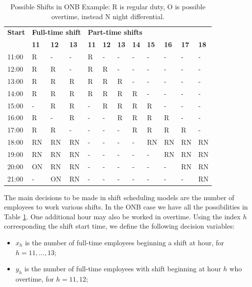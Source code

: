 \documentclass[a4paper,10 pt,titlepage,twoside]{book}
\theoremstyle{plain}
\theoremstyle{definition}
\theoremstyle{remark}
\begin{document}
{{\begin{table}[]\caption{\label{table:Shiftscheduling2}Possible Shifts in ONB Example: R is regular duty, O is possible overtime, instead N night differential.}
	\begin{center}
	\begin{tabular}{llllllllllll}
		\hline{\textbf{Start}} & \multicolumn{3}{l}{\textbf{Full-time shift}} & \multicolumn{8}{l}{\textbf{Part-time shifts}} \\ \cline{2-12} 
		& \textbf{11} & \textbf{12} & \textbf{13} & \textbf{11} & \textbf{12} & \textbf{13} & \textbf{14} & \textbf{15} & \textbf{16} & \textbf{17} & \textbf{18} \\ \hline
		11:00 & R & - & - & R & - & - & - & - & - & - & - \\
		12:00 & R & R & - & R & R & - & - & - & - & - & - \\
		13:00 & R & R & R & R & R & R & - & - & - & - & - \\
		14:00 & R & R & R & R & R & R & R & - & - & - & - \\
		15:00 & - & R & R & - & R & R & R & R & - & - & - \\
		16:00 & R & - & R & - & - & R & R & R & R & - & - \\
		17:00 & R & R & - & - & - & - & R & R & R & R & - \\
		18:00 & RN & RN & RN & - & - & - & - & RN & RN & RN & RN \\
		19:00 & RN & RN & RN & - & - & - & - & - & RN & RN & RN \\
		20:00 & ON & RN & RN & - & - & - & - & - & - & RN & RN \\
		21:00 & - & ON & RN & - & - & - & - & - & - & - & RN \\ \hline
	\end{tabular}
	\end{center}
\end{table}
The main decisions to be made in shift scheduling models are the number of employees to work various shifts. In the ONB case we have all the possibilities in Table \ref{table:Shiftscheduling2}. One additional hour may also be worked in overtime.
Using the index $h$ corresponding the shift start time, we define the following decision variables:
\begin{itemize}
	\item $x_{h}$ is the number of full-time employees beginning a shift at hour, for $h =11, \dots, 13$;
	\item $y_{h}$ is the number of full-time employees with shift beginning at hour $h$ who overtime, for $h=11, 12$;

\end{itemize}}}
\end{document}
